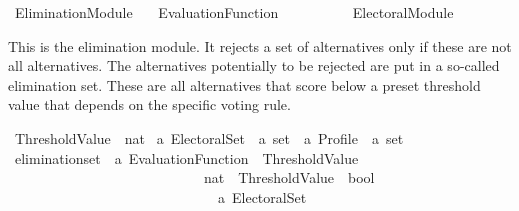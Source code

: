 %
\begin{isabellebody}%
%
%
\isadelimdocument
\isanewline
%
\endisadelimdocument
%
\isatagdocument
\isanewline
%
\isamarkuptrue%
%
\endisatagdocument
{\isafolddocument}%
%
\isadelimdocument
%
\endisadelimdocument
%
\isadelimtheory
%
\endisadelimtheory
%
\isatagtheory
{}\isamarkupfalse%
\ Elimination{\isacharunderscore}{\kern0pt}Module\isanewline
\ \ \ Evaluation{\isacharunderscore}{\kern0pt}Function\isanewline
\ \ \ \ \ \ \ \ \ \ Electoral{\isacharunderscore}{\kern0pt}Module\isanewline
{}%
\endisatagtheory
{\isafoldtheory}%
%
\isadelimtheory
%
\endisadelimtheory
%
\begin{isamarkuptext}%
This is the elimination module. It rejects a set of alternatives only if these
are not all alternatives. The alternatives potentially to be rejected are put
in a so-called elimination set. These are all alternatives that score below
a preset threshold value that depends on the specific voting rule.%
\end{isamarkuptext}\isamarkuptrue%
%
\isadelimdocument
%
\endisadelimdocument
%
\isatagdocument
%
\isamarkuptrue%
%
\endisatagdocument
{\isafolddocument}%
%
\isadelimdocument
%
\endisadelimdocument
{}\isamarkupfalse%
\ Threshold{\isacharunderscore}{\kern0pt}Value\ {\isacharequal}{\kern0pt}\ nat\isanewline
\isanewline
{}\isamarkupfalse%
\ {\isacharprime}{\kern0pt}a\ Electoral{\isacharunderscore}{\kern0pt}Set\ {\isacharequal}{\kern0pt}\ {\isachardoublequoteopen}{\isacharprime}{\kern0pt}a\ set\ {\isasymRightarrow}\ {\isacharprime}{\kern0pt}a\ Profile\ {\isasymRightarrow}\ {\isacharprime}{\kern0pt}a\ set{\isachardoublequoteclose}\isanewline
\isanewline
{}\isamarkupfalse%
\ elimination{\isacharunderscore}{\kern0pt}set\ {\isacharcolon}{\kern0pt}{\isacharcolon}{\kern0pt}\ {\isachardoublequoteopen}{\isacharprime}{\kern0pt}a\ Evaluation{\isacharunderscore}{\kern0pt}Function\ {\isasymRightarrow}\ Threshold{\isacharunderscore}{\kern0pt}Value\ {\isasymRightarrow}\isanewline
\ \ \ \ \ \ \ \ \ \ \ \ \ \ \ \ \ \ \ \ \ \ \ \ \ \ \ \ {\isacharparenleft}{\kern0pt}nat\ {\isasymRightarrow}\ Threshold{\isacharunderscore}{\kern0pt}Value\ {\isasymRightarrow}\ bool{\isacharparenright}{\kern0pt}\ {\isasymRightarrow}\isanewline
\ \ \ \ \ \ \ \ \ \ \ \ \ \ \ \ \ \ \ \ \ \ \ \ \ \ \ \ \ \ {\isacharprime}{\kern0pt}a\ Electoral{\isacharunderscore}{\kern0pt}Set{\isachardoublequoteclose}\ \isanewline

\end{isabellebody}
